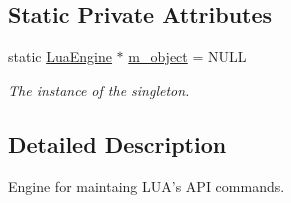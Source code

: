 \subsection*{Static Private Attributes}
\begin{DoxyCompactItemize}
\item 
static \hyperlink{class_lua_engine}{Lua\-Engine} $\ast$ \hyperlink{class_lua_engine_a27899d8e22a8da3067519562500b9c7f}{m\-\_\-object} = N\-U\-L\-L
\begin{DoxyCompactList}\small\item\em The instance of the singleton. \end{DoxyCompactList}\end{DoxyCompactItemize}


\subsection{Detailed Description}
Engine for maintaing L\-U\-A's A\-P\-I commands. 

